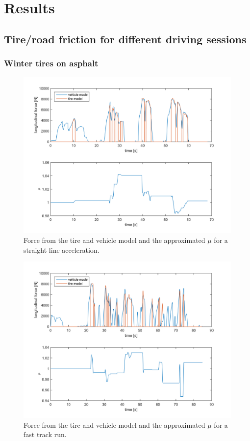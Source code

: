 \chapter{Results}

\section{Tire/road friction for different driving sessions}

\subsection{Winter tires on asphalt}

\begin{figure}[h]
	\centering
	\includegraphics[width=1.0\textwidth]{Pictures/force_mue_olika_acc}
	\caption {Force from the tire and vehicle model and the approximated $ \mu $ for a straight line acceleration.}
	\label{force_mue_olika_acc}
\end{figure}

\begin{figure}[h]
	\centering
	\includegraphics[width=1.0\textwidth]{Pictures/force_mue_race}
	\caption {Force from the tire and vehicle model and the approximated $ \mu $ for a fast track run.}
	\label{force_mue_race}
\end{figure}


